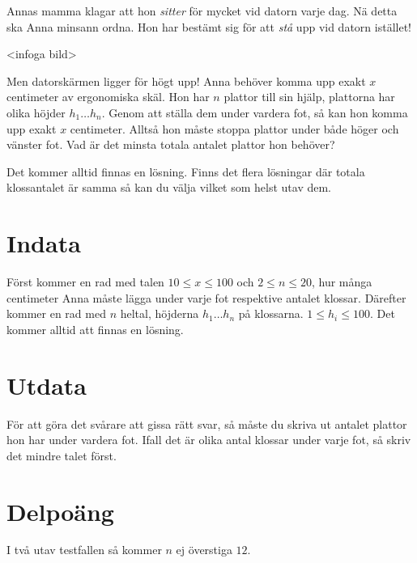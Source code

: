 Annas mamma klagar att hon \emph{sitter} för mycket vid datorn varje
dag. Nä detta ska Anna minsann ordna. Hon har bestämt sig för att
\emph{stå} upp vid datorn istället!

<infoga bild>

Men datorskärmen ligger för högt upp! Anna behöver komma upp exakt
$x$ centimeter av ergonomiska skäl. Hon har $n$ plattor till sin
hjälp, plattorna har olika höjder $h_1 \dots h_n$. Genom att ställa
dem under vardera fot, så kan hon komma upp exakt $x$ centimeter.
Alltså hon måste stoppa plattor under både höger och vänster fot.
Vad är det minsta totala antalet plattor hon behöver?

Det kommer alltid finnas en lösning. Finns det flera lösningar där
totala klossantalet är samma så kan du välja vilket som helst utav
dem.

\section*{Indata}

Först kommer en rad med talen $10 \leq x \leq 100$ och $2 \leq n \leq
20$, hur många centimeter Anna måste lägga under varje fot respektive
antalet klossar. Därefter kommer en rad med $n$ heltal, höjderna $h_1
\dots h_n$ på klossarna. $1 \leq h_i \leq 100$. Det kommer alltid att
finnas en lösning.

\section*{Utdata}

För att göra det svårare att gissa rätt svar, så måste du skriva
ut antalet plattor hon har under vardera fot. Ifall det är olika antal
klossar under varje fot, så skriv det mindre talet först.

\section*{Delpoäng}

I två utav testfallen så kommer $n$ ej överstiga $12$.

